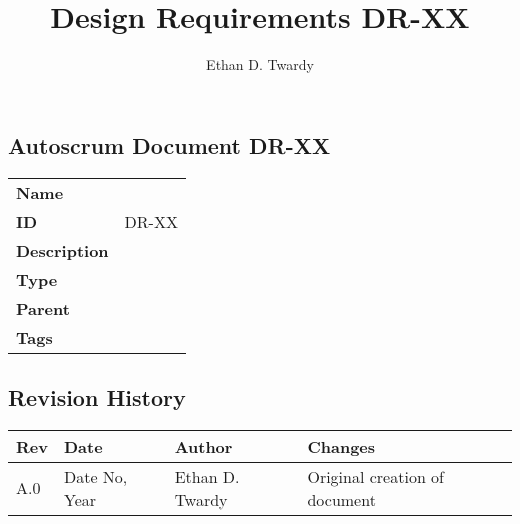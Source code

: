 \documentclass[12pt]{article}
\title{Design Requirements DR-XX}
\author{Ethan D. Twardy}
\begin{document}
\doublespacing

\subsection*{Autoscrum Document DR-XX}
\begin{tabular}{l p{377pt}}
  \textbf{Name} \\
  \textbf{ID} & DR-XX \\
  \textbf{Description} \\
  \textbf{Type} \\
  \textbf{Parent} \\
  \textbf{Tags} \\
\end{tabular}

\pagebreak
\subsection*{Revision History}
\begin{centering}
  \begin{tabular}{|l|l|l|l|}
    \hline
    Rev & Date & Author & Changes \\
    \hline \hline
    A.0 & Date No, Year & Ethan D. Twardy &
    Original creation of document \\
    \hline
  \end{tabular}
\end{centering}
\end{document}
